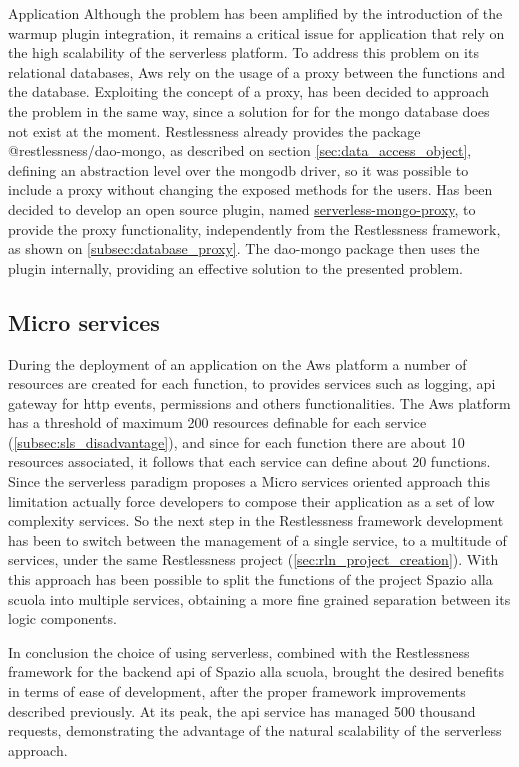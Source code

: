 \begin{chapter}{Application}
    Although the problem has been amplified by the introduction of the warmup plugin
    integration, it remains a critical issue for application that rely on the high
    scalability of the serverless platform.
    To address this problem on its relational databases, Aws rely on the usage of a
    proxy between the functions and the database. Exploiting the concept of a proxy,
    has been decided to approach the problem in the same way, since a solution for
    for the mongo database does not exist at the moment.
    Restlessness already provides the package @restlessness/dao-mongo, as described on
    section \ref{sec:data_access_object}, defining an abstraction level over the
    mongodb driver, so it was possible to include a proxy without changing the
    exposed methods for the users.
    Has been decided to develop an open source plugin, named
    \href{https://github.com/getapper/serverless-mongo-proxy}{serverless-mongo-proxy},
    to provide the proxy functionality, independently from the Restlessness framework,
    as shown on \ref{subsec:database_proxy}.
    The dao-mongo package then uses the plugin internally, providing an effective
    solution to the presented problem.

    \subsection{Micro services}
    During the deployment of an application on the Aws platform a number of resources
    are created for each function, to provides services such as logging, api gateway
    for http events, permissions and others functionalities. The Aws platform has a
    threshold of maximum 200 resources definable for each service
    (\ref{subsec:sls_disadvantage}), and since for each function there are about 10
    resources associated, it follows that each service can define about 20 functions.
    Since the serverless paradigm proposes a Micro services oriented approach this
    limitation actually force developers to compose their application as a set of
    low complexity services.
    So the next step in the Restlessness framework development has been to switch
    between the management of a single service, to a multitude of services, under
    the same Restlessness project (\ref{sec:rln_project_creation}). With this
    approach has been possible to split the functions of the project Spazio alla
    scuola into multiple services, obtaining a more fine grained separation between
    its logic components.

    \bigbreak
    In conclusion the choice of using serverless, combined with the Restlessness
    framework for the backend api of Spazio alla scuola, brought the desired benefits
    in terms of ease of development, after the proper framework
    improvements described previously.
    At its peak, the api service has managed 500 thousand requests, demonstrating
    the advantage of the natural scalability of the serverless approach.


\end{chapter}
